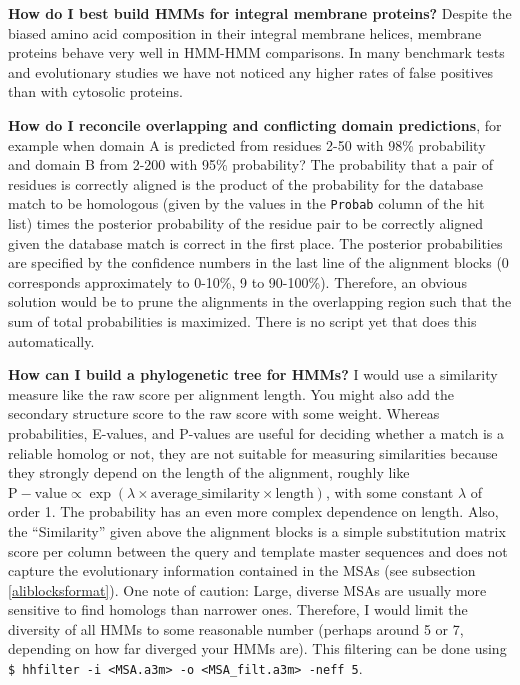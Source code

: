 \documentclass[11pt,a4paper]{article}
\begin{document}
{\bf How do I best build HMMs for integral membrane proteins?}
Despite the biased amino acid composition in their integral membrane helices, membrane proteins behave very well in HMM-HMM comparisons. In many benchmark tests and evolutionary studies we have not noticed any higher rates of false positives than with cytosolic proteins. 

{\bf How do I reconcile overlapping and conflicting domain predictions}, for example when domain A is predicted from residues 2-50 with 98\% probability and domain B from 2-200 with 95\% probability? The probability that a pair of residues is correctly aligned is the product of the probability for the database match to be homologous (given by the values in the \verb`Probab` column of the hit list) times the posterior probability of the residue pair to be correctly aligned given the database match is correct in the first place. The posterior probabilities are specified by the confidence numbers in the last line of the alignment blocks (0 corresponds approximately to 0-10\%, 9 to 90-100\%). Therefore, an obvious solution would be to prune the alignments in the overlapping region such that the sum of total probabilities is maximized. There is no script yet that does this automatically.

{\bf How can I build a phylogenetic tree for HMMs?}
I would use a similarity measure like the raw score per alignment length. You might also add the secondary structure score to the raw score with some weight. Whereas probabilities, E-values, and P-values are useful for deciding whether a match is a reliable homolog or not, they are not suitable for measuring similarities because they strongly depend on the length of the alignment, roughly like $\mathrm{P-value} \propto \exp(\lambda \times \mathrm{average\_similarity} \times \mathrm{length})$, with some constant $\lambda$ of order 1. The probability has an even more complex dependence on length. Also, the ``Similarity'' given above the alignment blocks is a simple substitution matrix score per column between the query and template master sequences and does not capture the evolutionary information contained in the MSAs (see subsection \ref{aliblocksformat}). One note of caution: Large, diverse MSAs are usually more sensitive to find homologs than narrower ones. Therefore, I would limit the diversity of all HMMs to some reasonable number (perhaps around 5 or 7, depending on how far diverged your HMMs are). This filtering can be done using \verb`$ hhfilter -i <MSA.a3m> -o <MSA_filt.a3m> -neff 5`. 
\end{document}
